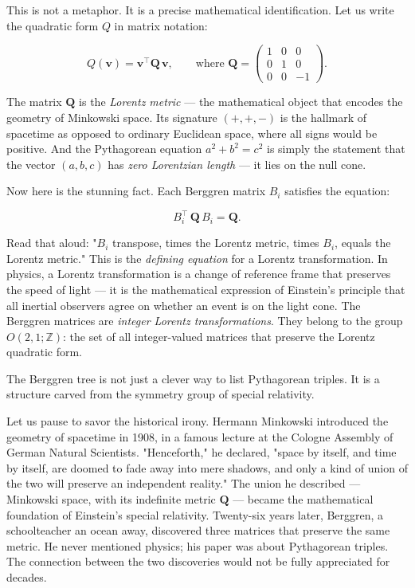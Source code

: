 This is not a metaphor. It is a precise mathematical identification. Let us write the quadratic form $Q$ in matrix notation:

\[Q(\mathbf{v}) = \mathbf{v}^\top \mathbf{Q} \, \mathbf{v}, \qquad \text{where } \mathbf{Q} = \begin{pmatrix} 1 & 0 & 0 \\ 0 & 1 & 0 \\ 0 & 0 & -1 \end{pmatrix}.\]

The matrix $\mathbf{Q}$ is the \textit{Lorentz metric} --- the mathematical object that encodes the geometry of Minkowski space. Its signature $(+, +, -)$ is the hallmark of spacetime as opposed to ordinary Euclidean space, where all signs would be positive. And the Pythagorean equation $a^2 + b^2 = c^2$ is simply the statement that the vector $(a, b, c)$ has \textit{zero Lorentzian length} --- it lies on the null cone.

Now here is the stunning fact. Each Berggren matrix $B_i$ satisfies the equation:

\[B_i^\top \, \mathbf{Q} \, B_i = \mathbf{Q}.\]

Read that aloud: "$B_i$ transpose, times the Lorentz metric, times $B_i$, equals the Lorentz metric." This is the \textit{defining equation} for a Lorentz transformation. In physics, a Lorentz transformation is a change of reference frame that preserves the speed of light --- it is the mathematical expression of Einstein's principle that all inertial observers agree on whether an event is on the light cone. The Berggren matrices are \textit{integer Lorentz transformations}. They belong to the group $O(2, 1; \mathbb{Z})$: the set of all integer-valued matrices that preserve the Lorentz quadratic form.

The Berggren tree is not just a clever way to list Pythagorean triples. It is a structure carved from the symmetry group of special relativity.


Let us pause to savor the historical irony. Hermann Minkowski introduced the geometry of spacetime in 1908, in a famous lecture at the Cologne Assembly of German Natural Scientists. "Henceforth," he declared, "space by itself, and time by itself, are doomed to fade away into mere shadows, and only a kind of union of the two will preserve an independent reality." The union he described --- Minkowski space, with its indefinite metric $\mathbf{Q}$ --- became the mathematical foundation of Einstein's special relativity. Twenty-six years later, Berggren, a schoolteacher an ocean away, discovered three matrices that preserve the same metric. He never mentioned physics; his paper was about Pythagorean triples. The connection between the two discoveries would not be fully appreciated for decades.

